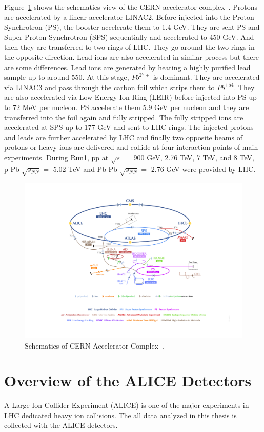 Figure~\ref{fig_3_lhc} shows the schematics view of the CERN accelerator complex~\cite{bib_cernaccel}. 
Protons are accelerated by a linear accelerator LINAC2. Before injected into the Proton Synchrotron (PS), the booster accelerate them to 1.4 GeV. 
They are sent PS and Super Proton Synchrotron (SPS) sequentially and accelerated to 450 GeV. 
And then they are transferred to two rings of LHC.
They go around the two rings in the opposite direction. 
Lead ions are also accelerated in similar process but there are some differences.
Lead ions are generated by heating a highly purified lead sample up to around 550.
At this stage, $Pb^{27+}$ is dominant. 
They are accelerated via LINAC3 and pass through the carbon foil which strips them to $Pb^{+54}$. 
They are also accelerated via Low Energy Ion Ring (LEIR) before injected into PS up to 72 MeV per nucleon.
PS accelerate them 5.9 GeV per nucleon and they are transferred into the foil again and fully stripped. 
The fully stripped ions are accelerated at SPS up to 177 GeV and sent to LHC rings. 
The injected protons and leads are further accelerated by LHC and finally two opposite beams of protons or heavy ions are delivered and collide at four interaction points of main experiments.
During Run1, pp at $\sqrt{s}=$ 900 GeV, 2.76 TeV, 7 TeV, and 8 TeV, p-Pb $\sqrt{s_{NN}}=$ 5.02 TeV and Pb-Pb $\sqrt{s_{NN}}=$ 2.76 GeV were provided by LHC. 
\begin{figure}[!h]
  \centering
  \includegraphics[width=12cm]{chap3/figure/LHC/CERNAcceleratorComplex.jpg}
  \caption{Schematics of CERN Accelerator Complex~\cite{bib_cernaccel}.}
  \label{fig_3_lhc}
\end{figure}


\section{Overview of the ALICE Detectors}
\label{sec_3_ALICE}
A Large Ion Collider Experiment (ALICE) is one of the major experiments in LHC dedicated heavy ion collisions. 
The all data analyzed in this thesis is collected with the ALICE detectors. 

